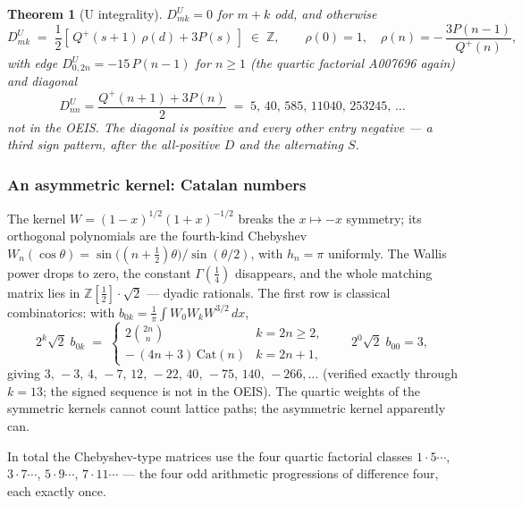 \documentclass[11pt,a4paper]{article}
\newtheorem{theorem}{Theorem}[section]
\theoremstyle{definition}
\newcommand{\Z}{\mathbb{Z}}
\newcommand{\G}{\Gamma}
\begin{document}
\begin{tcolorbox}[colback=black!5, colframe=black!5, boxrule=0pt, sharp corners]
\begin{theorem}[U integrality]\label{thm:chebU-int}
$D^U_{mk} = 0$ for $m+k$ odd, and otherwise
\[
  D^U_{mk} \;=\; \frac12 \left[\, Q^{+}(s{+}1)\,\rho(d) + 3P(s) \,\right]
  \;\in\; \Z,
  \qquad
  \rho(0)=1, \quad \rho(n) = -\,\frac{3P(n-1)}{Q^{+}(n)} ,
\]
with edge $D^U_{0,2n} = -15\,P(n-1)$ for $n \ge 1$ (the quartic
factorial A007696 again) and diagonal
\[
  D^U_{nn} = \frac{Q^{+}(n{+}1) + 3P(n)}{2}
  \;=\; 5,\, 40,\, 585,\, 11040,\, 253245,\, \ldots
\]
not in the OEIS. The diagonal is positive and every other entry
negative --- a third sign pattern, after the all-positive $D$ and the
alternating $S$.
\end{theorem}
\end{tcolorbox}

\subsubsection*{An asymmetric kernel: Catalan numbers}

The kernel $W = (1-x)^{1/2}(1+x)^{-1/2}$ breaks the $x \mapsto -x$
symmetry; its orthogonal polynomials are the fourth-kind Chebyshev
$W_n(\cos\theta) = \sin\bigl((n{+}\tfrac12)\theta\bigr)/\sin(\theta/2)$,
with $h_n = \pi$ uniformly. The Wallis power drops to zero, the
constant $\G(\tfrac14)$ disappears, and the whole matching matrix lies
in $\Z[\tfrac12]\cdot\sqrt2$ --- dyadic rationals. The first row is
classical combinatorics: with $b_{0k} = \frac1\pi \int W_0 W_k
W^{3/2}\, dx$,
\[
  2^k \sqrt2\; b_{0k} \;=\;
  \begin{cases}
    2\binom{2n}{n} & k = 2n \ge 2, \\[4pt]
    -\,(4n+3)\,\mathrm{Cat}(n) & k = 2n+1,
  \end{cases}
  \qquad
  2^0\sqrt2\; b_{00} = 3,
\]
giving $3,\, -3,\, 4,\, -7,\, 12,\, -22,\, 40,\, -75,\, 140,\, -266,
\ldots$ (verified exactly through $k=13$; the signed sequence is not
in the OEIS). The quartic weights of the symmetric kernels cannot
count lattice paths; the asymmetric kernel apparently can.

In total the Chebyshev-type matrices use the four quartic
factorial classes $1{\cdot}5{\cdots}$, $3{\cdot}7{\cdots}$,
$5{\cdot}9{\cdots}$, $7{\cdot}11{\cdots}$ --- the four odd
arithmetic progressions of difference four, each exactly once.

\end{document}
